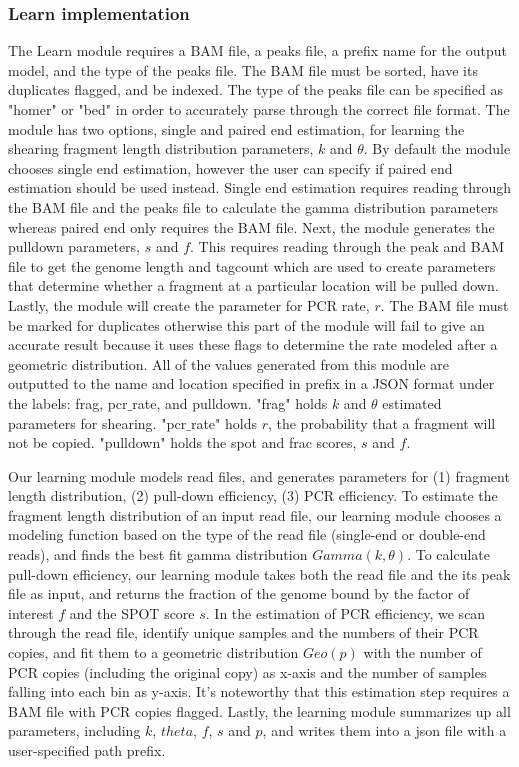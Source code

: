 \documentclass[12pt]{article}
\begin{document}
\subsubsection*{Learn implementation}
The Learn module requires a BAM file, a peaks file, a prefix name for the output model, and the type of the peaks file.
The BAM file must be sorted, have its duplicates flagged, and be indexed.
The type of the peaks file can be specified as "homer" or "bed" in order to accurately parse through the correct file format.
The module has two options, single and paired end estimation, for learning the shearing fragment length distribution parameters, $k$ and $\theta$.
By default the module chooses single end estimation, however the user can specify if paired end estimation should be used instead.
Single end estimation requires reading through the BAM file and the peaks file to calculate the gamma distribution parameters whereas paired end only requires the BAM file.
Next, the module generates the pulldown parameters, $s$ and $f$.
This requires reading through the peak and BAM file to get the genome length and tagcount which are used to create parameters that determine whether a fragment at a particular location will be pulled down. 
Lastly, the module will create the parameter for PCR rate, $r$. 
The BAM file must be marked for duplicates otherwise this part of the module will fail to give an accurate result because it uses these flags to determine the rate modeled after a geometric distribution.
All of the values generated from this module are outputted to the name and location specified in prefix in a JSON format under the labels: frag, pcr$\_$rate, and pulldown.
"frag" holds $k$ and $\theta$ estimated parameters for shearing.
"pcr$\_$rate" holds $r$, the probability that a fragment will not be copied.
"pulldown" holds the spot and frac scores, $s$ and $f$.

Our learning module models read files, and generates parameters for 
(1) fragment length distribution, (2) pull-down efficiency, (3) PCR efficiency.
To estimate the fragment length distribution of an input read file,
our learning module chooses a modeling function based on the type of the read file (single-end or double-end reads),
and finds the best fit gamma distribution $Gamma (k, \theta)$.
To calculate pull-down efficiency, our learning module takes both the read file and the its peak file as input,
and returns the fraction of the genome bound by the factor of interest $f$ and the SPOT score $s$.
In the estimation of PCR efficiency, we scan through the read file, 
identify unique samples and the numbers of their PCR copies,
and fit them to a geometric distribution $Geo(p)$ with the number of PCR copies (including the original copy)
as x-axis and the number of samples falling into each bin as y-axis.
It’s noteworthy that this estimation step requires a BAM file with PCR copies flagged. Lastly, the learning module summarizes up all parameters, including $k$, $theta$, $f$, $s$ and $p$, and writes them into a json file with a user-specified path prefix.
\end{document}
